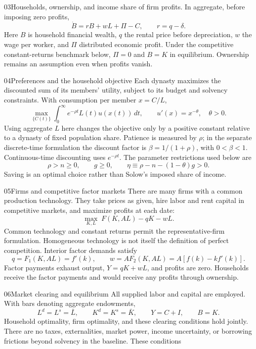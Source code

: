 \begin{modelsetup}[1]
\begin{modelcondition}{03}{Households, ownership, and income}
share of firm profits. In aggregate, before imposing zero profits,
\[
\dot B=rB+wL+\Pi-C,\qquad r=q-\delta.
\]
Here $B$ is household financial wealth, $q$ the rental price before depreciation,
$w$ the wage per worker, and $\Pi$ distributed economic profit. Under the
competitive constant-returns benchmark below, $\Pi=0$ and $B=K$ in equilibrium.
Ownership remains an assumption even when profits vanish.
\end{modelcondition}
\begin{modelcondition}{04}{Preferences and the household objective}
Each dynasty maximizes the discounted sum of its members' utility, subject to
its budget and solvency constraints. With consumption per member $x=C/L$,
\[
\max_{\{C(t)\}}\int_0^\infty e^{-\rho t}L(t)u(x(t))\,dt,
\qquad u'(x)=x^{-\theta},\quad\theta>0.
\]
Using aggregate $L$ here changes the objective only by a positive constant
relative to a dynasty of fixed population share. Patience is measured by
$\rho$; in the separate discrete-time formulation the discount factor is
$\beta=1/(1+\rho)$, with $0<\beta<1$. Continuous-time discounting uses
$e^{-\rho t}$. The parameter restrictions used below are
\[
\rho>n\geq0,\qquad g\geq0,\qquad
\eta\equiv\rho-n-(1-\theta)g>0.
\]
Saving is an optimal choice rather than Solow's imposed share of income.
\end{modelcondition}
\begin{modelcondition}{05}{Firms and competitive factor markets}
There are many firms with a common production technology. They take prices
as given, hire labor and rent capital in competitive markets, and maximize
profits at each date:
\[
\max_{K,L}\;F(K,AL)-qK-wL.
\]
Common technology and constant returns permit the representative-firm
formulation. Homogeneous technology is not itself the definition of perfect
competition. Interior factor demands satisfy
\[
q=F_1(K,AL)=f'(k),\qquad
w=AF_2(K,AL)=A[f(k)-kf'(k)].
\]
Factor payments exhaust output, $Y=qK+wL$, and profits are zero. Households
receive the factor payments and would receive any profits through ownership.
\end{modelcondition}
\begin{modelcondition}{06}{Market clearing and equilibrium}
All supplied labor and capital are employed. With bars denoting aggregate
endowments,
\[
L^d=L^s=\bar L,\qquad K^d=K^s=\bar K,\qquad
Y=C+I,\qquad B=K.
\]
Household optimality, firm optimality, and these clearing conditions hold
jointly. There are no taxes, externalities, market power, income uncertainty,
or borrowing frictions beyond solvency in the baseline. These conditions

\end{modelcondition}
\end{modelsetup}
